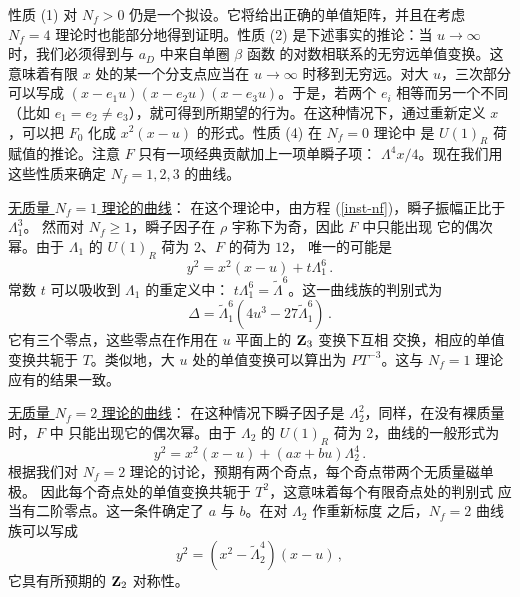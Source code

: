 性质 (1) 对 $N_f > 0$ 仍是一个拟设。它将给出正确的单值矩阵，并且在考虑
$N_f = 4$ 理论时也能部分地得到证明。性质 (2) 是下述事实的推论：当
$u \rightarrow \infty$ 时，我们必须得到与 $a_D$ 中来自单圈 $\beta$ 函数
的对数相联系的无穷远单值变换。这意味着有限 $x$ 处的某一个分支点应当在
$u\rightarrow\infty$ 时移到无穷远。对大 $u$，三次部分可以写成
$(x-e_1 u)(x-e_2 u)(x-e_3 u)$。于是，若两个 $e_i$ 相等而另一个不同（比如
$e_1=e_2\not=e_3$），就可得到所期望的行为。在这种情况下，通过重新定义
$x$，可以把 $F_0$ 化成 $x^2 (x-u)$ 的形式。性质 (4) 在 $N_f = 0$ 理论中
是 $U(1)_R$ 荷赋值的推论。注意 $F$ 只有一项经典贡献加上一项单瞬子项：
$\Lambda^4 x/4$。现在我们用这些性质来确定 $N_f = 1,2,3$ 的曲线。

\noindent\underline{无质量 $N_f=1$ 理论的曲线}：
在这个理论中，由方程 (\ref{inst-nf})，瞬子振幅正比于 $\Lambda^3_{1}$。
然而对 $N_f \geq 1$，瞬子因子在 $\rho$ 宇称下为奇，因此 $F$ 中只能出现
它的偶次幂。由于 $\Lambda_{1}$ 的 $U(1)_R$ 荷为 $2$、$F$ 的荷为 $12$，
唯一的可能是
$$
y^2 = x^2 (x-u) + t \Lambda^{6}_{1} \,.
$$
常数 $t$ 可以吸收到 $\Lambda_{1}$ 的重定义中：
$t\Lambda^{6}_{1}=\tilde{\Lambda}^6$。这一曲线族的判别式为
$$
\Delta = \tilde{\Lambda}^{6}_{1} (4 u^3 - 27 \tilde{\Lambda}^{6}_{1})\,.
$$
它有三个零点，这些零点在作用在 $u$ 平面上的 ${\bf Z}_3$ 变换下互相
交换，相应的单值变换共轭于 $T$。类似地，大 $u$ 处的单值变换可以算出为
$PT^{-3}$。这与 $N_f=1$ 理论应有的结果一致。


\noindent\underline{无质量 $N_f=2$ 理论的曲线}：
在这种情况下瞬子因子是 $\Lambda^{2}_{2}$，同样，在没有裸质量时，$F$ 中
只能出现它的偶次幂。由于 $\Lambda_2$ 的 $U(1)_R$ 荷为 2，曲线的一般形式为
$$
y^2 = x^2 (x-u) + (ax + bu) \Lambda^{4}_{2}\,.
$$
根据我们对 $N_f=2$ 理论的讨论，预期有两个奇点，每个奇点带两个无质量磁单极。
因此每个奇点处的单值变换共轭于 $T^2$，这意味着每个有限奇点处的判别式
应当有二阶零点。这一条件确定了 $a$ 与 $b$。在对 $\Lambda_2$ 作重新标度
之后，$N_f=2$ 曲线族可以写成
$$
y^2 = (x^2 - \tilde{\Lambda}^{4}_{2} ) (x-u)\,,
$$
它具有所预期的 ${\bf Z}_2$ 对称性。


